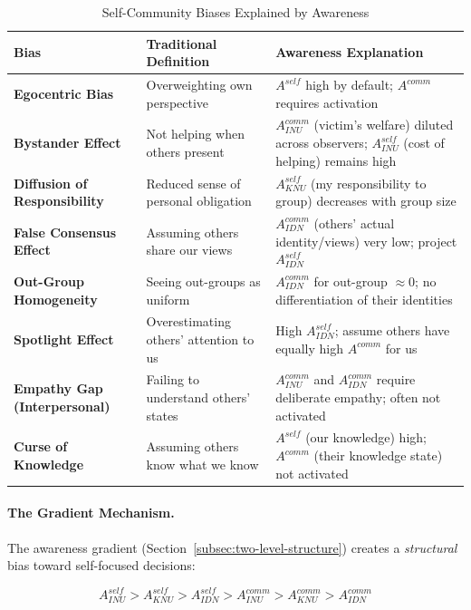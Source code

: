 \begin{table}[htbp]
\centering
\caption{Self-Community Biases Explained by Awareness}
\label{tab:self-community-biases}
\renewcommand{\arraystretch}{1.4}
\begin{tabular}{@{}lp{4cm}p{6cm}@{}}
\toprule
\textbf{Bias} & \textbf{Traditional Definition} & \textbf{Awareness Explanation} \\
\midrule
\textbf{Egocentric Bias} & 
Overweighting own perspective & 
$A^{self}$ high by default; $A^{comm}$ requires activation \\
\midrule
\textbf{Bystander Effect} & 
Not helping when others present & 
$A^{comm}_{INU}$ (victim's welfare) diluted across observers; $A^{self}_{INU}$ (cost of helping) remains high \\
\midrule
\textbf{Diffusion of Responsibility} & 
Reduced sense of personal obligation & 
$A^{self}_{KNU}$ (my responsibility to group) decreases with group size \\
\midrule
\textbf{False Consensus Effect} & 
Assuming others share our views & 
$A^{comm}_{IDN}$ (others' actual identity/views) very low; project $A^{self}_{IDN}$ \\
\midrule
\textbf{Out-Group Homogeneity} & 
Seeing out-groups as uniform & 
$A^{comm}_{IDN}$ for out-group $\approx 0$; no differentiation of their identities \\
\midrule
\textbf{Spotlight Effect} & 
Overestimating others' attention to us & 
High $A^{self}_{IDN}$; assume others have equally high $A^{comm}$ for us \\
\midrule
\textbf{Empathy Gap (Interpersonal)} & 
Failing to understand others' states & 
$A^{comm}_{INU}$ and $A^{comm}_{IDN}$ require deliberate empathy; often not activated \\
\midrule
\textbf{Curse of Knowledge} & 
Assuming others know what we know & 
$A^{self}$ (our knowledge) high; $A^{comm}$ (their knowledge state) not activated \\
\bottomrule
\end{tabular}
\end{table}

\paragraph{The Gradient Mechanism.}
The awareness gradient (Section~\ref{subsec:two-level-structure}) creates 
a \emph{structural} bias toward self-focused decisions:

\begin{equation}
A^{self}_{INU} > A^{self}_{KNU} > A^{self}_{IDN} > A^{comm}_{INU} > A^{comm}_{KNU} > A^{comm}_{IDN}
\end{equation}

